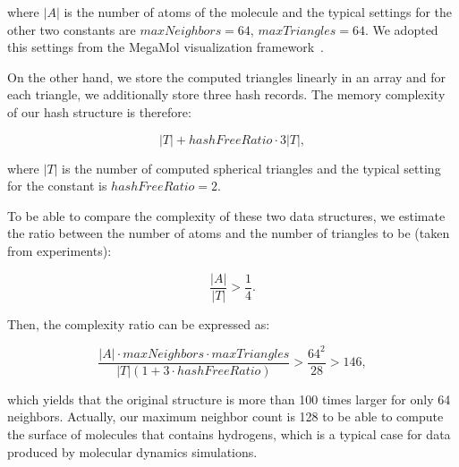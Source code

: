 where $|A|$ is the number of atoms of the molecule and the typical settings for the other two constants are $maxNeighbors = 64$, $maxTriangles = 64$.
We adopted this settings from the MegaMol visualization framework~\cite{grottel2015megamol}.

On the other hand, we store the computed triangles linearly in an array and for each triangle, we additionally store three hash records. 
The memory complexity of our hash structure is therefore:

\begin{equation}
|T| + hashFreeRatio \cdot 3 |T|,
\end{equation}

where $|T|$ is the number of computed spherical triangles and the typical setting for the constant is $hashFreeRatio = 2$. 

To be able to compare the complexity of these two data structures, we estimate the ratio between the number of atoms and the number of triangles to be (taken from experiments):

\begin{equation}
\frac{|A|}{|T|} > \frac{1}{4}.
\end{equation}

Then, the complexity ratio can be expressed as:

\begin{equation}
\frac{|A| \cdot maxNeighbors \cdot maxTriangles}{|T|(1 + 3 \cdot hashFreeRatio)} > \frac{64^2}{28} > 146,
\end{equation}

which yields that the original structure is more than 100 times larger for only 64 neighbors.
Actually, our maximum neighbor count is 128 to be able to compute the surface of molecules that contains hydrogens, which is a typical case for data produced by molecular dynamics simulations.